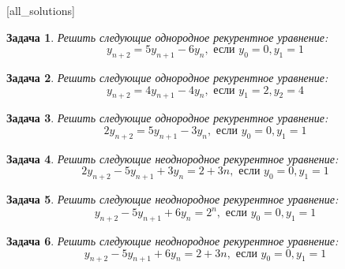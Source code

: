 \documentclass[12pt, a4paper]{article}
\newtheorem{problem}{Задача}
\begin{document}
[all_solutions]


\begin{problem}
Решить следующие однородное рекурентное уравнение:
\[y_{n+2} = 5 y_{n+1} - 6 y_n, \text{ если } y_0 = 0, y_1 = 1\]
\begin{sol}

\end{sol}
\end{problem}



\begin{problem}
Решить следующие однородное рекурентное уравнение:
\[y_{n+2} = 4 y_{n+1} - 4 y_n, \text{ если } y_1 = 2, y_2 = 4\] 
\begin{sol}

\end{sol}
\end{problem}



\begin{problem}
Решить следующие однородное рекурентное уравнение:
\[2y_{n+2} = 5 y_{n+1} - 3 y_n, \text{ если } y_0 = 0, y_1 = 1\]
\begin{sol}

\end{sol}
\end{problem}



\begin{problem}
Решить следующие неоднородное рекурентное уравнение:
\[2y_{n+2} - 5 y_{n+1} + 3 y_n = 2 + 3n, \text{ если } y_0 = 0, y_1 = 1\]
\begin{sol}

\end{sol}
\end{problem}



\begin{problem}
Решить следующие неоднородное рекурентное уравнение:
\[y_{n+2} - 5 y_{n+1} + 6 y_n = 2^n, \text{ если } y_0 = 0, y_1 = 1\]
\begin{sol}

\end{sol}
\end{problem}



\begin{problem}
Решить следующие неоднородное рекурентное уравнение:
\[y_{n+2} - 5 y_{n+1} + 6 y_n = 2 + 3n, \text{ если } y_0 = 0, y_1 = 1\]
\begin{sol}

\end{sol}
\end{problem}
\end{document}
